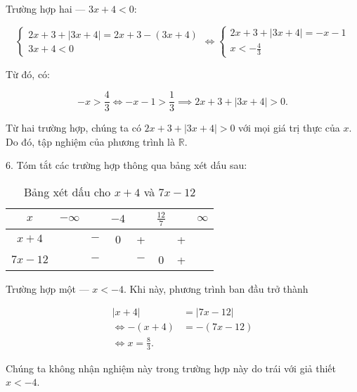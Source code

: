 \textcolor{colorEmphasis}{Trường hợp hai --- $3x + 4 < 0$}:

\begin{equation*}
   \begin{cases}
      2x + 3 + |3x + 4| = 2x + 3 - (3x + 4) \\
      3x + 4 < 0
   \end{cases} \iff \begin{cases}
      2x + 3 + |3x + 4| = -x - 1 \\
      x < -\frac{4}{3}
   \end{cases}
\end{equation*}

Từ đó, có:

\begin{equation*}
   -x > \frac{4}{3} \iff -x - 1 > \frac{1}{3} \implies 2x + 3 + |3x + 4| > 0.
\end{equation*}

Từ hai trường hợp, chúng ta có $2x + 3 + |3x + 4| > 0$ với mọi giá trị thực của $x$. Do đó, tập nghiệm của phương trình là $\mathbb{R}$.

6. Tóm tắt các trường hợp thông qua bảng xét dấu sau:

\begin{table}[H]
   \centering
   \begin{tabular}{|c|ccccccc|}
   \hline
   $x$          & $-\infty$ &     & $-4$ &     & $\frac{12}{7}$ &   & $\infty$ \\
   \hline
   $x+4$        &           & $-$ &  0  &  +  &     & + &           \\
   \hline
   $7x-12$        &           & $-$ &     & $-$ &  0  & + &           \\
   \hline
   \end{tabular}
   \caption{Bảng xét dấu cho $x+4$ và $7x-12$}
   \label{tab:toan_hoc_nen_tang:ham_so_mot_bien:ham_tung_phan:gpt7}
\end{table}

\textcolor{colorEmphasisCyan}{Trường hợp một --- $x < -4$}. Khi này, phương trình ban đầu trở thành

\begin{align*}
   |x + 4| &= |7x - 12| \\
   \iff -(x + 4) &= -(7x - 12) \\
   \iff x = \frac{8}{3}.
\end{align*}

Chúng ta không nhận nghiệm này trong trường hợp này do trái với giả thiết $x < -4$.


